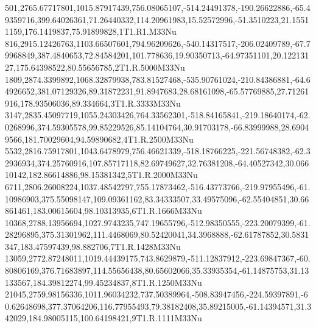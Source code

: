 501,2765.67717801,1015.87917439,756.08065107,-514.24491378,-190.26622886,-65.49359716,399.64026361,71.26440332,114.20961983,15.52572996,-51.3510223,21.15511159,176.1419837,75.91899828,1T1.R1.M33Nu
816,2915.12426763,1103.66507601,794.96209626,-540.14317517,-206.02409789,-67.79968849,387.4840653,72.84584201,101.778636,19.90350713,-64.97351101,20.12213127,175.64398522,80.55656785,2T1.R.5000M33Nu
1809,2874.3399892,1068.32879938,783.81527468,-535.90761024,-210.84386881,-64.64926652,381.07129326,89.31872231,91.8947683,28.68161098,-65.57769885,27.71261916,178.93506036,89.334664,3T1.R.3333M33Nu
3147,2835.45097719,1055.24303426,764.33562301,-518.84165841,-219.18640174,-62.0268996,374.59305578,99.85229526,85.14104764,30.91703178,-66.83999988,28.69049566,181.70029604,94.59890682,4T1.R.2500M33Nu
5532,2816.75917801,1043.6478979,756.46621339,-518.18766225,-221.56748382,-62.32936934,374.25760916,107.85717118,82.69749627,32.76381208,-64.40527342,30.06610142,182.86614886,98.15381342,5T1.R.2000M33Nu
6711,2806.26008224,1037.48542797,755.17873462,-516.43773766,-219.97955496,-61.10986903,375.55098147,109.09361162,83.34333507,33.49575096,-62.55404851,30.66861461,183.00615604,98.10313935,6T1.R.1666M33Nu
10368,2788.13956694,1027.9743235,747.19655796,-512.98350555,-223.20079399,-61.28296895,375.31301962,111.4468069,80.52420041,34.3968888,-62.61787852,30.5831347,183.47597439,98.882706,7T1.R.1428M33Nu
13059,2772.87248011,1019.44439175,743.8629879,-511.12837912,-223.69847367,-60.80806169,376.71683897,114.55656438,80.65602066,35.33935354,-61.14875753,31.13133567,184.39812274,99.45234837,8T1.R.1250M33Nu
21045,2759.98156336,1011.96034232,737.50389964,-508.83947456,-224.59397891,-60.62648698,377.37064206,116.77955493,79.38182408,35.89215005,-61.14394571,31.342029,184.98005115,100.64198421,9T1.R.1111M33Nu
